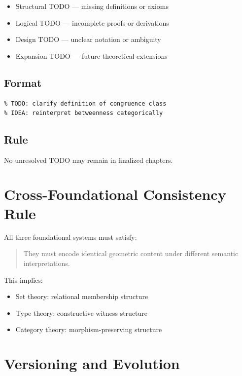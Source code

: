 \documentclass{book}
\begin{document}
\begin{itemize}
    \item Structural TODO — missing definitions or axioms
    \item Logical TODO — incomplete proofs or derivations
    \item Design TODO — unclear notation or ambiguity
    \item Expansion TODO — future theoretical extensions
\end{itemize}

\subsection{Format}

\begin{verbatim}
% TODO: clarify definition of congruence class
% IDEA: reinterpret betweenness categorically
\end{verbatim}

\subsection{Rule}

No unresolved TODO may remain in finalized chapters.

\section{Cross-Foundational Consistency Rule}

All three foundational systems must satisfy:

\begin{quote}
They must encode identical geometric content under different semantic interpretations.
\end{quote}

This implies:

\begin{itemize}
    \item Set theory: relational membership structure
    \item Type theory: constructive witness structure
    \item Category theory: morphism-preserving structure
\end{itemize}

\section{Versioning and Evolution}
\end{document}

